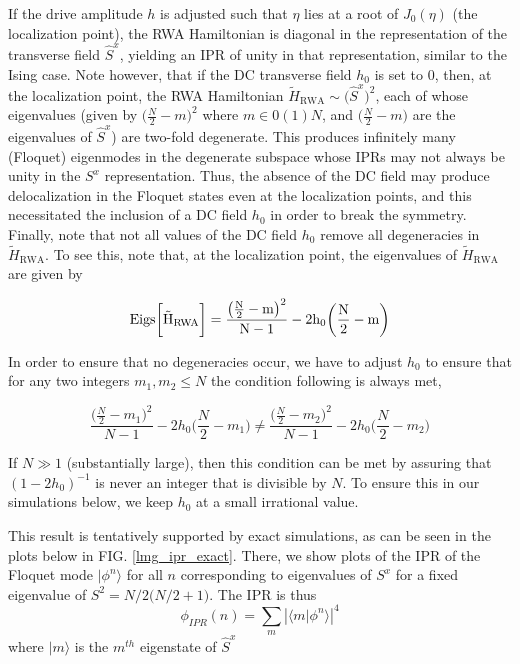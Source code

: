\documentclass[%
 reprint,
 amsmath,amssymb,
 aps,
]{revtex4-2}
\begin{document}
If the drive amplitude $h$ is adjusted such that $\eta$ lies at a root of $J_0(\eta)$ (the localization point), the RWA Hamiltonian is diagonal in the representation of the transverse field $\hat{S}^x$, yielding an IPR of unity in that representation, similar to the Ising case. Note however, that if the DC transverse field $h_0$ is set to $0$, then, at the localization point, the RWA Hamiltonian $\tilde{H}_{\mathrm{RWA}}\sim
\big(\hat{S}^x\big)^2$, each of whose eigenvalues (given by $\big(\frac{N}{2}-m\big)^2$ where $m \in 0(1)N$, and $\big(\frac{N}{2}-m\big)$  are the eigenvalues of $\hat{S}^x$) are two-fold degenerate. This produces infinitely many (Floquet) eigenmodes in the degenerate subspace whose IPRs may not always be unity in the $S^x$ representation. Thus, the absence of the DC field may produce delocalization in the Floquet states even at the localization points, and this necessitated the inclusion of a DC field $h_0$ in order to break the symmetry.
Finally, note that not all values of the DC field $h_0$ remove all degeneracies in $\tilde{H}_{\mathrm{RWA}}$. To see this, note that, at the localization point, the eigenvalues of $\tilde{H}_{\mathrm{RWA}}$ are given by

\begin{equation}
	\rm{Eigs}\bigg[\tilde{H}_{\mathrm{RWA}}\bigg] = \frac{\big(\frac{N}{2}-m\big)^2}{N-1} - 2h_0 \bigg(\frac{N}{2}-m\bigg)
\end{equation}

In order to ensure that no degeneracies occur, we have to adjust $h_0$ to ensure that for any two integers $m_1, m_2 \leq N$  the condition following is always met,

\begin{equation}
	\frac{\big(\frac{N}{2}-m_1\big)^2}{N-1} - 2h_0 \bigg(\frac{N}{2}-m_1\bigg) \neq \frac{\big(\frac{N}{2}-m_2\big)^2}{N-1} - 2h_0 \bigg(\frac{N}{2}-m_2\bigg)
\end{equation}

If $N\gg 1$ (substantially large), then this condition can be met by assuring that $(1-2h_0)^{-1}$ is never an integer that is divisible by $N$. To ensure this in our simulations below, we keep $h_0$ at a small irrational value.


This result is tentatively supported by exact simulations, as can be seen in the plots below in FIG. \ref{lmg_ipr_exact}. There, we show plots of the IPR of the Floquet mode $|\phi^n\rangle$ for all $n$ corresponding to eigenvalues of $S^x$ for a fixed eigenvalue of $S^2 = N/2\big(N/2 + 1\big)$. The IPR is thus
\begin{equation}
	\phi_{IPR}(n) = \sum_m \left\vert\langle m\vert\phi^n\rangle\right\vert^4
	\label{iprlmg}
\end{equation}
where $|m\rangle$ is the $m^{th}$ eigenstate of $\hat{S}^x$
\end{document}
